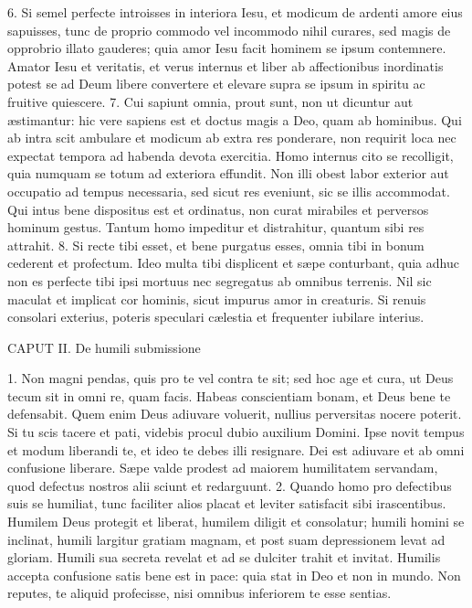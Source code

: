 6. Si semel perfecte introisses in interiora Iesu, et modicum de ardenti amore eius sapuisses, tunc de proprio commodo vel incommodo nihil curares, sed magis de opprobrio illato gauderes; quia amor Iesu facit hominem se ipsum contemnere. Amator Iesu et veritatis, et verus internus et liber ab affectionibus inordinatis potest se ad Deum libere convertere et elevare supra se ipsum in spiritu ac fruitive quiescere.
7. Cui sapiunt omnia, prout sunt, non ut dicuntur aut æstimantur: hic vere sapiens est et doctus magis a Deo, quam ab hominibus. Qui ab intra scit ambulare et modicum ab extra res ponderare, non requirit loca nec expectat tempora ad habenda devota exercitia. Homo internus cito se recolligit, quia numquam se totum ad exteriora effundit. Non illi obest labor exterior aut occupatio ad tempus necessaria, sed sicut res eveniunt, sic se illis accommodat. Qui intus bene dispositus est et ordinatus, non curat mirabiles et perversos hominum gestus. Tantum homo impeditur et distrahitur, quantum sibi res attrahit.
8. Si recte tibi esset, et bene purgatus esses, omnia tibi in bonum cederent et profectum. Ideo multa tibi displicent et sæpe conturbant, quia adhuc non es perfecte tibi ipsi mortuus nec segregatus ab omnibus terrenis. Nil sic maculat et implicat cor hominis, sicut impurus amor in creaturis. Si renuis consolari exterius, poteris speculari cælestia et frequenter iubilare interius.

CAPUT II.
De humili submissione

1. Non magni pendas, quis pro te vel contra te sit; sed hoc age et cura, ut Deus tecum sit in omni re, quam facis. Habeas conscientiam bonam, et Deus bene te defensabit. Quem enim Deus adiuvare voluerit, nullius perversitas nocere poterit. Si tu scis tacere et pati, videbis procul dubio auxilium Domini. Ipse novit tempus et modum liberandi te, et ideo te debes illi resignare. Dei est adiuvare et ab omni confusione liberare. Sæpe valde prodest ad maiorem humilitatem servandam, quod defectus nostros alii sciunt et redarguunt.
2. Quando homo pro defectibus suis se humiliat, tunc faciliter alios placat et leviter satisfacit sibi irascentibus. Humilem Deus protegit et liberat, humilem diligit et consolatur; humili homini se inclinat, humili largitur gratiam magnam, et post suam depressionem levat ad gloriam. Humili sua secreta revelat et ad se dulciter trahit et invitat. Humilis accepta confusione satis bene est in pace: quia stat in Deo et non in mundo. Non reputes, te aliquid profecisse, nisi omnibus inferiorem te esse sentias.


